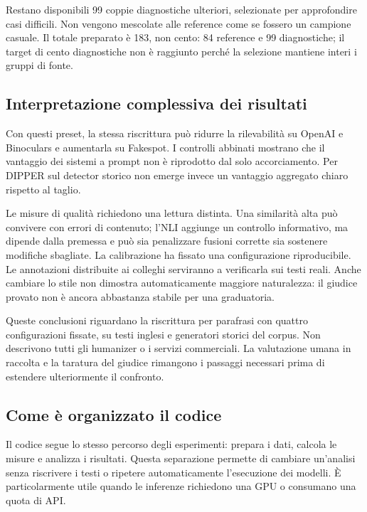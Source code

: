 \documentclass[11pt,a4paper]{article}
\begin{document}
Restano disponibili 99 coppie diagnostiche ulteriori, selezionate per approfondire casi difficili. Non vengono mescolate alle reference come se fossero un campione casuale. Il totale preparato è 183, non cento: 84 reference e 99 diagnostiche; il target di cento diagnostiche non è raggiunto perché la selezione mantiene interi i gruppi di fonte.

\subsection{Interpretazione complessiva dei risultati}\label{interpretazione-complessiva-dei-risultati}

Con questi preset, la stessa riscrittura può ridurre la rilevabilità su OpenAI e Binoculars e aumentarla su Fakespot. I controlli abbinati mostrano che il vantaggio dei sistemi a prompt non è riprodotto dal solo accorciamento. Per DIPPER sul detector storico non emerge invece un vantaggio aggregato chiaro rispetto al taglio.

Le misure di qualità richiedono una lettura distinta. Una similarità alta può convivere con errori di contenuto; l'NLI aggiunge un controllo informativo, ma dipende dalla premessa e può sia penalizzare fusioni corrette sia sostenere modifiche sbagliate. La calibrazione ha fissato una configurazione riproducibile. Le annotazioni distribuite ai colleghi serviranno a verificarla sui testi reali. Anche cambiare lo stile non dimostra automaticamente maggiore naturalezza: il giudice provato non è ancora abbastanza stabile per una graduatoria.

Queste conclusioni riguardano la riscrittura per parafrasi con quattro configurazioni fissate, su testi inglesi e generatori storici del corpus. Non descrivono tutti gli humanizer o i servizi commerciali. La valutazione umana in raccolta e la taratura del giudice rimangono i passaggi necessari prima di estendere ulteriormente il confronto.

\subsection{Come è organizzato il codice}\label{come-uxe8-organizzato-il-codice}

Il codice segue lo stesso percorso degli esperimenti: prepara i dati, calcola le misure e analizza i risultati. Questa separazione permette di cambiare un'analisi senza riscrivere i testi o ripetere automaticamente l'esecuzione dei modelli. È particolarmente utile quando le inferenze richiedono una GPU o consumano una quota di API.
\end{document}
